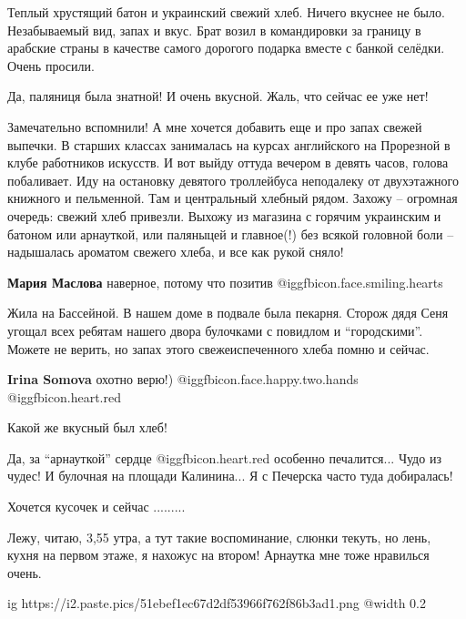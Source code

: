 \begin{itemize}

Теплый хрустящий батон и украинский свежий хлеб. Ничего вкуснее не было.
Незабываемый вид, запах и вкус. Брат возил в командировки за границу в арабские
страны в качестве самого дорогого подарка вместе с банкой селёдки. Очень
просили.

Да, паляниця была знатной! И очень вкусной. Жаль, что сейчас ее уже нет!


Замечательно вспомнили! А мне хочется добавить еще и про запах свежей выпечки.
В старших классах занималась на курсах английского на Прорезной в клубе
работников искусств. И вот выйду оттуда вечером в девять часов, голова
побаливает. Иду на остановку девятого троллейбуса неподалеку от двухэтажного
книжного и пельменной. Там и центральный хлебный рядом. Захожу – огромная
очередь: свежий хлеб привезли. Выхожу из магазина с горячим украинским и
батоном или арнауткой, или паляныцей и главное(!) без всякой головной боли –
надышалась ароматом свежего хлеба, и все как рукой сняло!

\textbf{Мария Маслова} наверное, потому что позитив @igg{fbicon.face.smiling.hearts} 


Жила на Бассейной. В нашем доме в подвале была пекарня. Сторож дядя Сеня угощал
всех ребятам нашего двора булочками с повидлом и \enquote{городскими}. Можете не
верить, но запах этого свежеиспеченного хлеба помню и сейчас.

\textbf{Irina Somova} охотно верю!) @igg{fbicon.face.happy.two.hands} @igg{fbicon.heart.red}

Какой же вкусный был хлеб!


Да, за \enquote{арнауткой} сердце @igg{fbicon.heart.red} особенно печалится... Чудо из чудес! И булочная на
площади Калинина... Я с Печерска часто туда добиралась!

Хочется кусочек и сейчас .........


Лежу, читаю, 3,55 утра, а тут такие воспоминание, слюнки текуть, но лень,
кухня на первом этаже, я нахожус на втором! Арнаутка мне тоже нравилься очень.

\ifcmt
  ig https://i2.paste.pics/51ebef1ec67d2df53966f762f86b3ad1.png
  @width 0.2
\fi


\end{itemize}
